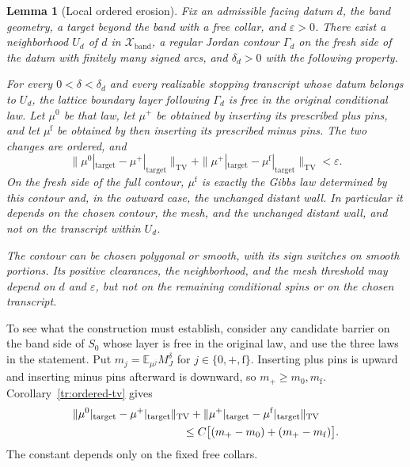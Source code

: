 \documentclass[11pt]{article}
\newtheorem{lemma}[theorem]{Lemma}
\theoremstyle{definition}
\theoremstyle{remark}
\numberwithin{equation}{section}
\begin{document}
\begin{lemma}[Local ordered erosion]\label{if:erosion}
Fix an admissible facing datum $d$, the band geometry, a target beyond
the band with a free collar, and $\varepsilon>0$.  There exist a
neighborhood $U_d$ of $d$ in $\mathcal X_{\mathrm{band}}$, a regular
Jordan contour $\Gamma_d$ on the fresh side of the datum with finitely
many signed arcs, and $\delta_d>0$ with the following property.

For every $0<\delta<\delta_d$ and every realizable stopping transcript
whose datum belongs to $U_d$, the lattice boundary layer following
$\Gamma_d$ is free in the original conditional law.  Let $\mu^0$ be
that law, let $\mu^+$ be obtained by inserting its prescribed plus
pins, and let $\mu^{\mathrm f}$ be obtained by then inserting its
prescribed minus pins.  The two changes are ordered, and
\begin{equation}\label{if:erosion-tv}
 \|\mu^0|_{\mathrm{target}}-\mu^+|_{\mathrm{target}}\|_{\mathrm{TV}}
 +\|\mu^+|_{\mathrm{target}}-\mu^{\mathrm f}|_{\mathrm{target}}\|_{\mathrm{TV}}
                   <\varepsilon.
\end{equation}
On the fresh side of the full contour, $\mu^{\mathrm f}$ is exactly
the Gibbs law determined by this contour and, in the outward case,
the unchanged distant wall.  In particular it depends on the chosen
contour, the mesh, and the unchanged distant wall, and not on the transcript within $U_d$.

The contour can be chosen polygonal or smooth, with its sign switches
on smooth portions.  Its positive clearances, the neighborhood, and
the mesh threshold may depend on $d$ and $\varepsilon$, but not on
the remaining conditional spins or on the chosen transcript.
\end{lemma}

To see what the construction must establish, consider any candidate
barrier on the band side of $S_0$ whose layer is free in the original
law, and use the three laws in the statement. Put $m_j=\mathbb E_{\mu^j}M_J^\delta$ for
$j\in\{0,+,\mathrm f\}$. Inserting plus pins is upward and inserting
minus pins afterward is downward, so $m_+\ge m_0,m_{\mathrm f}$.
Corollary~\ref{tr:ordered-tv} gives
\begin{equation}\label{if:erosion-mean-reduction}
\begin{split}
 &\|\mu^0|_{\mathrm{target}}-\mu^+|_{\mathrm{target}}\|_{\mathrm{TV}}
 +\|\mu^+|_{\mathrm{target}}-\mu^{\mathrm f}|_{\mathrm{target}}\|_{\mathrm{TV}}\\
 &\hspace{35mm}\le C\bigl[(m_+-m_0)+(m_+-m_{\mathrm f})\bigr].
\end{split}
\end{equation}
The constant depends only on the fixed free collars.
\end{document}
